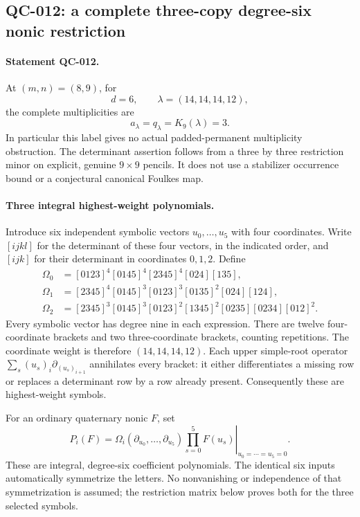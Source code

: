 \subsection{QC-012: a complete three-copy degree-six nonic restriction}

\paragraph{Statement QC-012.}
At $(m,n)=(8,9)$, for
\[
                  d=6,\qquad \lambda=(14,14,14,12),
\]
the complete multiplicities are
\[
                      a_\lambda=q_\lambda=K_9(\lambda)=3.
                      \tag{QC-012.1}
\]
In particular this label gives no actual padded-permanent multiplicity
obstruction.  The determinant assertion follows from a three by three
restriction minor on explicit, genuine $9\times9$ pencils.  It does not
use a stabilizer occurrence bound or a conjectural canonical Foulkes map.

\paragraph{Three integral highest-weight polynomials.}
Introduce six independent symbolic vectors $u_0,\ldots,u_5$ with four
coordinates.  Write $[ijkl]$ for the determinant of these four vectors,
in the indicated order, and $[ijk]$ for their determinant in coordinates
$0,1,2$.  Define
\begin{align*}
 \Omega_0&=[0123]^4[0145]^4[2345]^4[024][135],\\
 \Omega_1&=[2345]^4[0145]^3[0123]^3[0135]^2[024][124],\\
 \Omega_2&=[2345]^3[0145]^3[0123]^2[1345]^2[0235][0234][012]^2.
\end{align*}
Every symbolic vector has degree nine in each expression.  There are
twelve four-coordinate brackets and two three-coordinate brackets,
counting repetitions.  The coordinate weight is therefore
$(14,14,14,12)$.  Each upper simple-root operator
$\sum_s (u_s)_i\partial_{(u_s)_{i+1}}$ annihilates every bracket: it
either differentiates a missing row or replaces a determinant row by a
row already present.  Consequently these are highest-weight symbols.

For an ordinary quaternary nonic $F$, set
\[
 P_i(F)=\left.
  \Omega_i(\partial_{u_0},\ldots,\partial_{u_5})
          \prod_{s=0}^5F(u_s)\right|_{u_0=\cdots=u_5=0}.
          \tag{QC-012.2}
\]
These are integral, degree-six coefficient polynomials.  The identical
six inputs automatically symmetrize the letters.  No nonvanishing or
independence of that symmetrization is assumed; the restriction matrix
below proves both for the three selected symbols.

